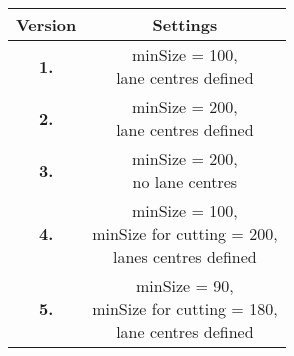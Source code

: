 \begin{tabular}{cc}
	\toprule
	\textbf{Version} & \textbf{Settings}                                                                                   \\ \midrule
	\textbf{1.}      & \makecell{minSize = 100, \\
		 lane centres defined}          \\

	\textbf{2.}      & \makecell{minSize = 200,\\ lane centres defined}                              \\

	\textbf{3.}      & \makecell{minSize = 200,\\ no lane centres}     \\   
           
	\textbf{4.}      & \makecell{minSize = 100,\\ minSize for cutting = 200,\\ lanes centres defined} \\

	\textbf{5.}      & \makecell{minSize = 90,\\ minSize for cutting = 180,\\ lane centres defined} \\
	\bottomrule
\end{tabular}